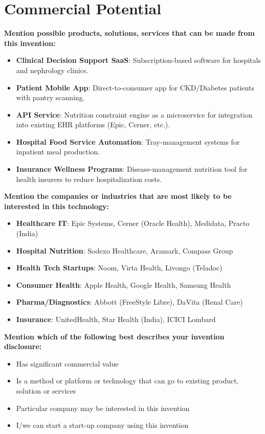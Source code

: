 \documentclass[a4paper,12pt]{article}
\begin{document}
\section*{Commercial Potential}

\textbf{Mention possible products, solutions, services that can be made from this invention:}
\begin{itemize}[itemsep=0.3em]
    \item \textbf{Clinical Decision Support SaaS}: Subscription-based software for hospitals and nephrology clinics.
    \item \textbf{Patient Mobile App}: Direct-to-consumer app for CKD/Diabetes patients with pantry scanning.
    \item \textbf{API Service}: Nutrition constraint engine as a microservice for integration into existing EHR platforms (Epic, Cerner, etc.).
    \item \textbf{Hospital Food Service Automation}: Tray-management systems for inpatient meal production.
    \item \textbf{Insurance Wellness Programs}: Disease-management nutrition tool for health insurers to reduce hospitalization costs.
\end{itemize}

\vspace{0.5cm}

\textbf{Mention the companies or industries that are most likely to be interested in this technology:}
\begin{itemize}[itemsep=0.3em]
    \item \textbf{Healthcare IT}: Epic Systems, Cerner (Oracle Health), Medidata, Practo (India)
    \item \textbf{Hospital Nutrition}: Sodexo Healthcare, Aramark, Compass Group
    \item \textbf{Health Tech Startups}: Noom, Virta Health, Livongo (Teladoc)
    \item \textbf{Consumer Health}: Apple Health, Google Health, Samsung Health
    \item \textbf{Pharma/Diagnostics}: Abbott (FreeStyle Libre), DaVita (Renal Care)
    \item \textbf{Insurance}: UnitedHealth, Star Health (India), ICICI Lombard
\end{itemize}

\vspace{0.5cm}

\textbf{Mention which of the following best describes your invention disclosure:}
\begin{itemize}[noitemsep]
    \item [$\boxtimes$] Has significant commercial value
    \item [$\boxtimes$] Is a method or platform or technology that can go to existing product, solution or services
    \item [$\boxtimes$] Particular company may be interested in this invention
    \item [$\square$] I/we can start a start-up company using this invention
\end{itemize}
\end{document}
